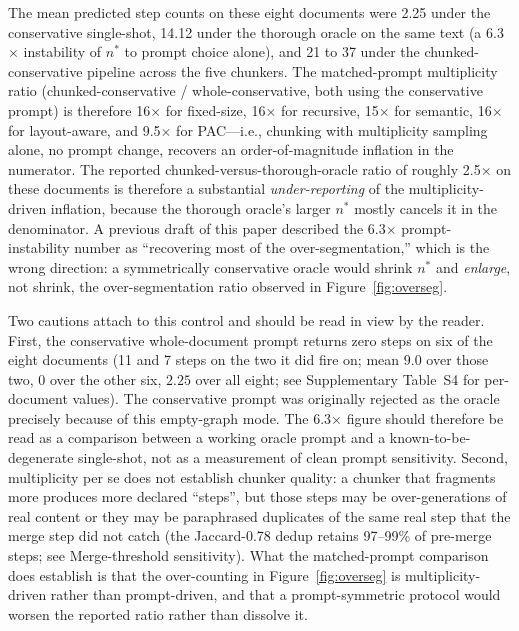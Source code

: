 \documentclass[make,article,submit,oneauthor,pdftex]{Definitions/mdpi}
\begin{document}
The mean predicted step counts on these eight documents were 2.25
under the conservative single-shot, 14.12 under the thorough oracle
on the same text (a 6.3$\times$ instability of $n^{*}$ to prompt
choice alone), and 21 to 37 under the chunked-conservative pipeline
across the five chunkers. The matched-prompt multiplicity ratio
(chunked-conservative / whole-conservative, both using the
conservative prompt) is therefore 16$\times$ for fixed-size, 16$\times$
for recursive, 15$\times$ for semantic, 16$\times$ for layout-aware,
and 9.5$\times$ for PAC---i.e., chunking with multiplicity sampling
alone, no prompt change, recovers an order-of-magnitude inflation in
the numerator. The reported chunked-versus-thorough-oracle ratio of
roughly 2.5$\times$ on these documents is therefore a substantial
\emph{under-reporting} of the multiplicity-driven inflation, because
the thorough oracle's larger $n^{*}$ mostly cancels it in the
denominator. A previous draft of this paper described the
6.3$\times$ prompt-instability number as ``recovering most of the
over-segmentation,'' which is the wrong direction: a symmetrically
conservative oracle would shrink $n^{*}$ and \emph{enlarge}, not
shrink, the over-segmentation ratio observed in
Figure~\ref{fig:overseg}.

Two cautions attach to this control and should be read in view by the
reader. First, the conservative whole-document prompt returns zero
steps on six of the eight documents (11 and 7 steps on the two it did
fire on; mean $9.0$ over those two, $0$ over the other six, $2.25$
over all eight; see Supplementary Table~S4 for per-document values).
The conservative prompt was originally rejected as the oracle
precisely because of this empty-graph mode. The 6.3$\times$ figure should therefore be
read as a comparison between a working oracle prompt and a
known-to-be-degenerate single-shot, not as a measurement of clean
prompt sensitivity. Second, multiplicity per se does not establish
chunker quality: a chunker that fragments more produces more declared
``steps'', but those steps may be over-generations of real content or
they may be paraphrased duplicates of the same real step that the
merge step did not catch (the Jaccard-0.78 dedup retains 97--99\% of
pre-merge steps; see Merge-threshold sensitivity). What the
matched-prompt comparison does establish is that the over-counting in
Figure~\ref{fig:overseg} is multiplicity-driven rather than
prompt-driven, and that a prompt-symmetric protocol would worsen the
reported ratio rather than dissolve it.
\end{document}

